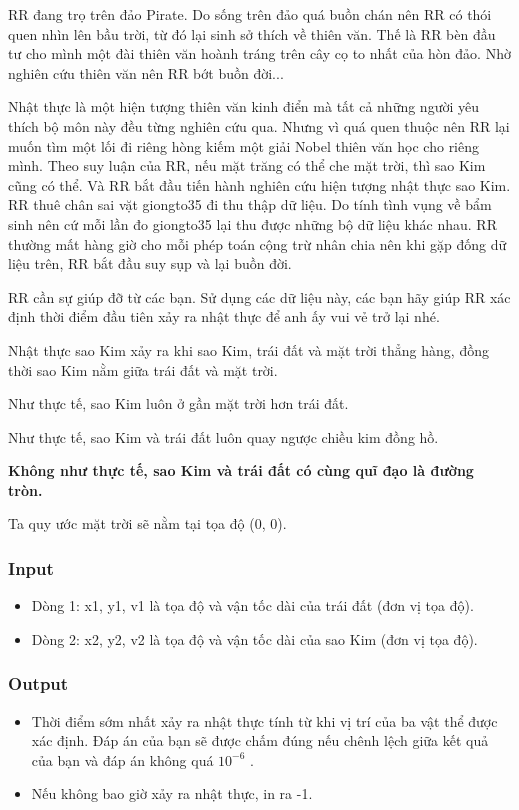 



   RR đang trọ trên đảo Pirate. Do sống trên đảo quá buồn chán nên RR có thói quen nhìn lên bầu trời, từ đó lại sinh sở thích về thiên văn. Thế là RR bèn đầu tư cho mình một đài thiên văn hoành tráng trên cây cọ to nhất của hòn đảo. Nhờ nghiên cứu thiên văn nên RR bớt buồn đời...  

   Nhật thực là một hiện tượng thiên văn kinh điển mà tất cả những người yêu thích bộ môn này đều từng nghiên cứu qua. Nhưng vì quá quen thuộc nên RR lại muốn tìm một lối đi riêng hòng kiếm một giải Nobel thiên văn học cho riêng mình. Theo suy luận của RR, nếu mặt trăng có thể che mặt trời, thì sao Kim cũng có thể. Và RR bắt đầu tiến hành nghiên cứu hiện tượng nhật thực sao Kim. RR thuê chân sai vặt giongto35 đi thu thập dữ liệu. Do tính tình vụng về bẩm sinh nên cứ mỗi lần đo giongto35 lại thu được những bộ dữ liệu khác nhau. RR thường mất hàng giờ cho mỗi phép toán cộng trừ nhân chia nên khi gặp đống dữ liệu trên, RR bắt đầu suy sụp và lại buồn đời.  

   RR cần sự giúp đỡ từ các bạn. Sử dụng các dữ liệu này, các bạn hãy giúp RR xác định thời điểm đầu tiên xảy ra nhật thực để anh ấy vui vẻ trở lại nhé.  

   Nhật thực sao Kim xảy ra khi sao Kim, trái đất và mặt trời thẳng hàng, đồng thời sao Kim nằm giữa trái đất và mặt trời.  

   Như thực tế, sao Kim luôn ở gần mặt trời hơn trái đất.  

   Như thực tế, sao Kim và trái đất luôn quay ngược chiều kim đồng hồ.  

\textbf{    Không như thực tế, sao Kim và trái đất có cùng quĩ đạo là đường tròn.   }

   Ta quy ước mặt trời sẽ nằm tại tọa độ (0, 0).  

\subsubsection{   Input  }
\begin{itemize}
	\item     Dòng 1: x1, y1, v1 là tọa độ và vận tốc dài của trái đất (đơn vị tọa độ).   
	\item      Dòng 2: x2, y2, v2 là tọa độ và vận tốc dài của sao Kim (đơn vị tọa độ).    
\end{itemize}

\subsubsection{   Output  }
\begin{itemize}
	\item     Thời điểm sớm nhất xảy ra nhật thực tính từ khi vị trí của ba vật thể được xác định. Đáp án của bạn sẽ được chấm đúng nếu chênh lệch giữa kết quả của bạn và đáp án không quá $10^{-6}$    .   
	\item     Nếu không bao giờ xảy ra nhật thực, in ra -1.   
\end{itemize}

